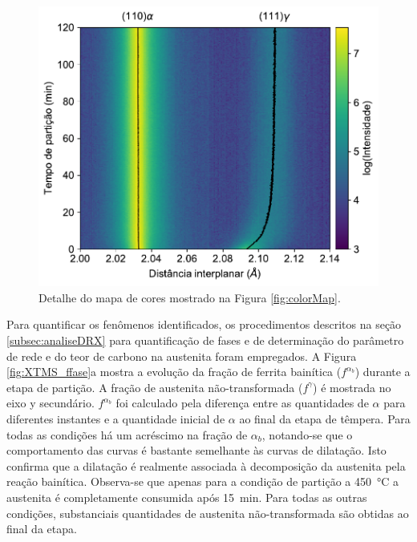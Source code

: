\begin{figure}
  \includegraphics[width=.7\textwidth]{img/XTMS/XTMS_colormap_detail.pdf}
  \caption{Detalhe do mapa de cores mostrado na Figura \ref{fig:colorMap}.}
  \label{fig:colorMap2}
\end{figure}

Para quantificar os fenômenos identificados, os procedimentos descritos na seção \ref{subsec:analiseDRX} para quantificação de fases e de determinação do parâmetro de rede e do teor de carbono na austenita foram empregados. A Figura \ref{fig:XTMS_ffase}a mostra a evolução da fração de ferrita bainítica ($f^{\alpha_b}$) durante a etapa de partição. A fração de austenita não-transformada ($f^\gamma$) é mostrada no eixo y secundário. $f^{\alpha_b}$ foi calculado pela diferença entre as quantidades de $\alpha$ para diferentes instantes e a quantidade inicial de $\alpha$ ao final da etapa de têmpera. Para todas as condições há um acréscimo na fração de $\alpha_b$, notando-se que o comportamento das curvas é bastante semelhante às curvas de dilatação. Isto confirma que a dilatação é realmente associada à decomposição da austenita pela reação bainítica.
Observa-se que apenas para a condição de partição a \SI{450}{\degreeCelsius} a austenita é completamente consumida após 15~min. Para todas as outras condições, substanciais quantidades de austenita não-transformada são obtidas ao final da etapa.

